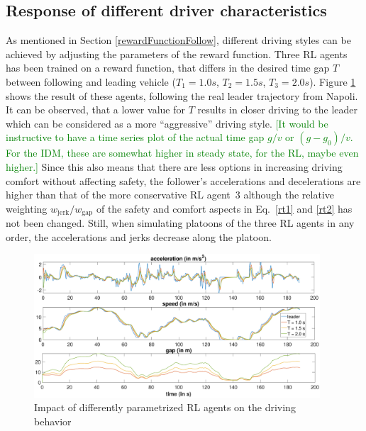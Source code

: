 \documentclass[review]{elsarticle}
\providecommand{\green}[1]{\textcolor{green}{#1}}
\providecommand{\martinc}[1]{\green{[#1]}} %
\providecommand{\sub}[1]{_{\mathrm{#1}}}  %
\providecommand{\3}{{\ss}}
\begin{document}
\subsection{Response of different driver characteristics}
\label{sec:differentT}

As mentioned in Section \ref{rewardFunctionFollow}, different driving styles
can be achieved by adjusting the parameters of the reward
function. Three RL agents has been trained on a reward function, that
differs in the desired time gap $T$ between following and
leading vehicle ($T_{1} = 1.0s$, $T_{2} = 1.5s$, 
$T_{3} =2.0s$). Figure \ref{fig:differentT} shows the result of these agents,
following the real leader trajectory from Napoli. It can be observed,
that a lower value for $T$ results in closer driving to the
leader which can be considered as a more ``aggressive''
driving style. \martinc{It would be instructive to have a time series
  plot of the actual time gap $g/v$ or $(g-g_0)/v$. For the IDM, these
  are somewhat higher in steady state, for the RL, maybe even higher.}
Since this also means that there are less options in
increasing driving comfort without affecting safety, the follower's
accelerations and decelerations are higher than that of the more
conservative RL agent~3 although the relative
weighting $w\sub{jerk}/w\sub{gap}$ of the safety and comfort aspects in Eq.~\eqref{rt1} and \eqref{rt2} has not been
changed. Still, when simulating platoons of the three RL
  agents in any order, the accelerations and jerks decrease along the
  platoon.

\begin{figure}
	\centering
	\includegraphics[width=0.95\textwidth]{images/differentT}
	\caption{Impact of differently parametrized RL agents
          on the driving behavior }
	\label{fig:differentT}
\end{figure}
\end{document}
